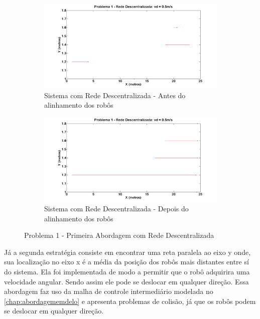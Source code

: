 \begin{figure}[!htb]
	\centering
	\begin{subfigure}{.5\textwidth}
		\centering
		\includegraphics[width=.9\linewidth]{./04-figuras/Simulacoes/Problema1-Abordagem1/P1_A1_Desc_Inicio}
		\caption{Sistema com Rede Descentralizada - Antes do alinhamento dos robôs}
		\label{fig:P1DIni}
	\end{subfigure}%
	\begin{subfigure}{.5\textwidth}
		\centering
		\includegraphics[width=.9\linewidth]{./04-figuras/Simulacoes/Problema1-Abordagem1/P1_A1_Desc_Fim}
		\caption{Sistema com Rede Descentralizada - Depois do alinhamento dos robôs}
		\label{fig:P1DFim}
	\end{subfigure}
	\caption{Problema 1 - Primeira Abordagem com Rede Descentralizada}
	\label{fig:sP1Desc}
\end{figure}

Já a segunda estratégia consiste em encontrar uma reta paralela ao eixo y onde, sua localização no eixo x é a média da posição dos robôs mais distantes entre sí do sistema. Ela foi implementada de modo a permitir que o robô adquirira uma velocidade angular. Sendo assim ele pode se deslocar em qualquer direção. Essa abordagem faz uso da malha de controle intermediário modelada no \autoref{chap:abordagememdelo} e apresenta problemas de colisão, já que os robôs podem se deslocar em qualquer direção.

